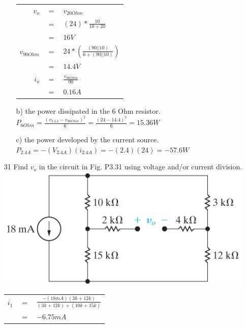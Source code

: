 \documentclass[a4paper]{article}
\begin{document}
\begin{itemize}
\begin{itemize}
\begin{tabular}{rcl}
	      	      	$v_{o}$      & $=$ & $v_{20 Ohm}$                               \\
	      	      	             & $=$ & $(24) * \frac{10}{10 + 20}$                \\
	      	      	             & $=$ & $16 V$                                     \\
	      	      	$v_{90 Ohm}$ & $=$ & $24 * (\frac{(90 || 10)}{6 + (90 || 10)})$ \\
	      	      	             & $=$ & $14.4 V$                                   \\
	      	      	$i_{o}$      & $=$ & $\frac{v_{90 Ohm}}{90}$                    \\
	      	      	             & $=$ & $0.16 A$                                   \\
	      	      \end{tabular} 
	      	\item[b)] the power dissipated in the 6 Ohm resistor. \\
	      	      $P_{6 Ohm} = \frac{(v_{2.4A} - v_{90 Ohm})^2}{6} = \frac{(24 - 14.4)^2}{6} = 15.36 W$ 
	      	\item[c)] the power developed by the current source. \\
	      	      $P_{2.4A} = -(V_{2.4A})(i_{2.4A}) = -(2.4)(24) = -57.6 W$  
	      \end{itemize} 
	\item[31] Find $v_{o}$ in the circuit in Fig. P3.31 using voltage and/or current division. \\
	      \includegraphics[scale=0.5]{3-31.png} \\  
	      \begin{tabular}{rcl}
	      	$i_{1}$   & $=$ & $\frac{-(18 mA)(3k + 12k)}{(3k + 12k) + (10k + 15k)}$ \\
	      	          & $=$ & $-6.75 mA$                                            \\

\end{tabular}
\end{itemize}
\end{document}
